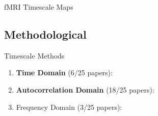 \documentclass[12pt]{beamer}
\begin{document}
\begin{frame}{fMRI Timescale Maps}
\centering
{}
\scriptsize
\cite{wengler_distinct_2020, shinn_functional_2023, ito_cortical_2020, manea_intrinsic_2022, muller_core_2020}
\end{frame}

\subsection{Methodological}
\footnotesize
\begin{frame}{Timescale Methods}
\begin{enumerate}
    \item \textbf{Time Domain} (6/25 papers):\\
    \begin{scriptsize}
        \cite{kaneoke_variance_2012, meisel_decline_2017, huang_timescales_2018, lurie_cortical_2024, shinn_functional_2023, shafiei_topographic_2020}
    \end{scriptsize}
    \item \textbf{Autocorrelation Domain} (18/25 papers):\\
    \begin{scriptsize}
        \cite{murray_hierarchy_2014, rossi-pool_invariant_2021, cirillo_neural_2018, ito_cortical_2020, runyan_distinct_2017, zeraati_flexible_2022, nougaret_intrinsic_2021, wasmuht_intrinsic_2018, muller_core_2020, maisson_choice-relevant_2021, li_hierarchical_2022, shafiei_topographic_2020, wengler_distinct_2020, manea_intrinsic_2022, watanabe_atypical_2019, zilio_are_2021, raut_hierarchical_2020, golesorkhi_temporal_2021}
    \end{scriptsize}
    \item Frequency Domain (3/25 papers):\\
    \begin{scriptsize}
        \cite{gao_neuronal_2020, zeraati_flexible_2022, fallon_timescales_2020}
    \end{scriptsize}
\end{enumerate}
\end{frame}
\end{document}
